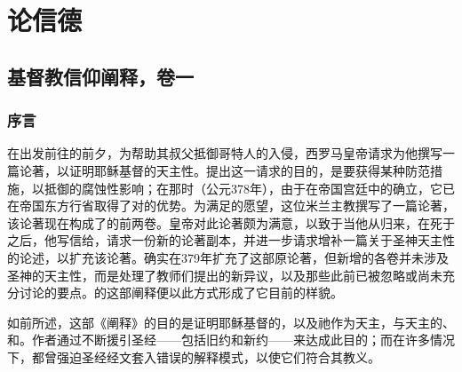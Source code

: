 
\chapter{论信德}


\section{基督教信仰阐释，卷一}



\subsection{序言}

在出发前往的前夕，为帮助其叔父抵御哥特人的入侵，西罗马皇帝请求为他撰写一篇论著，以证明耶稣基督的天主性。提出这一请求的目的，是要获得某种防范措施，以抵御的腐蚀性影响；在那时（公元378年），由于在帝国宫廷中的确立，它已在帝国东方行省取得了对的优势。为满足的愿望，这位米兰主教撰写了一篇论著，该论著现在构成了的前两卷。皇帝对此论著颇为满意，以致于当他从归来，在死于之后，他写信给，请求一份新的论著副本，并进一步请求增补一篇关于圣神天主性的论述，以扩充该论著。确实在379年扩充了这部原论著，但新增的各卷并未涉及圣神的天主性，而是处理了教师们提出的新异议，以及那些此前已被忽略或尚未充分讨论的要点。的这部阐释便以此方式形成了它目前的样貌。\par

如前所述，这部《阐释》的目的是证明耶稣基督的，以及祂作为天主，与天主的、和。作者通过不断援引圣经——包括旧约和新约——来达成此目的；而在许多情况下，都曾强迫圣经经文套入错误的解释模式，以使它们符合其教义。\par

